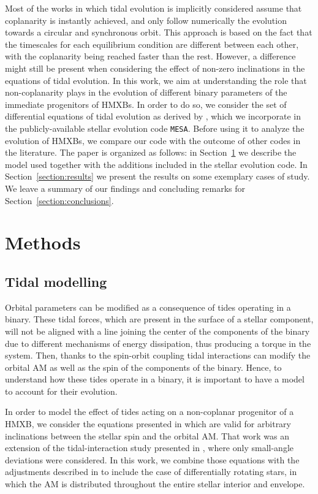\documentclass{aa}
\begin{document}
Most of the works in which tidal evolution is implicitly considered assume that coplanarity is instantly achieved, and only follow
numerically the evolution towards a circular and synchronous orbit. This approach is based on the fact that the timescales for each
equilibrium condition are different between each other, with the coplanarity being reached faster than the rest. However, a difference
might still be present when considering the effect of non-zero inclinations in the equations of tidal evolution. In this work, we aim at
understanding the role that non-coplanarity plays in the evolution of different binary parameters of the immediate progenitors of HMXBs. In
order to do so, we consider the set of differential equations of tidal evolution as derived by \citet{repetto2014}, which we incorporate in
the publicly-available stellar evolution code {\tt MESA}. Before using it to analyze the evolution of HMXBs, we compare our code with the
outcome of other codes in the literature. The paper is organized as follows: in Section~\ref{section:model} we describe the model used
together with the additions included in the stellar evolution code. In Section~\ref{section:results} we present the results on some
exemplary cases of study. We leave a summary of our findings and concluding remarks for Section~\ref{section:conclusions}.

\section{Methods}
\label{section:model}

\subsection{Tidal modelling}
\label{subsection:tidal-model}

Orbital parameters can be modified as a consequence of tides operating in a binary. These tidal forces, which are present in the surface of
a stellar component, will not be aligned with a line joining the center of the components of the binary due to different mechanisms of
energy dissipation, thus producing a torque in the system. Then, thanks to the spin-orbit coupling tidal interactions can modify the
orbital AM as well as the spin of the components of the binary. Hence, to understand how these tides operate in a binary, it is important
to have a model to account for their evolution.

In order to model the effect of tides acting on a non-coplanar progenitor of a HMXB, we consider the equations presented in
\citet{repetto2014} which are valid for arbitrary inclinations between the stellar spin and the orbital AM. That work was an extension of
the tidal-interaction study presented in \citet{hut1981}, where only small-angle deviations were considered. In this work, we combine those
equations with the adjustments described in \citet{paxton2015} to include the case of differentially rotating stars, in which the AM is
distributed throughout the entire stellar interior and envelope.
\end{document}
